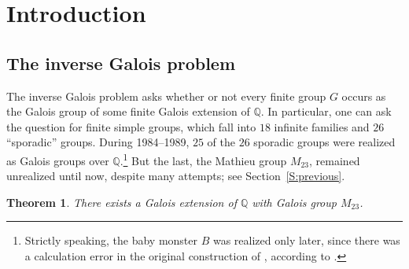\documentclass[12pt,reqno]{amsart}
\newcommand{\Q}{\mathbb{Q}}
\newtheorem{theorem}{Theorem}[section]
\theoremstyle{definition}
\theoremstyle{remark}
\begin{document}
\begin{abstract}
Researchers studying the inverse Galois problem realized 25 of the 26 sporadic finite simple groups 
as Galois groups over $\Q$ during 1984--1989.
We complete this program by proving that the last remaining sporadic group, the Mathieu group $M_{23}$, 
occurs as a Galois group over $\Q$.
In fact, we produce an explicit degree $23$ polynomial with rational 
coefficients whose splitting field has Galois group $M_{23}$ over $\Q$. 
To accomplish this, we use a non-rigid triple of conjugacy classes of $M_{23}$ and compute Belyi maps to construct an explicit regular Galois extension of $\Q(t)$ with Galois group $M_{23}$.
Essential for our computation is the numerical Belyi map algorithm developed and implemented by Klug, Musty, Schiavone, Sijsling, and Voight, inspired by ideas of Hejhal and Stark.
\end{abstract}

\maketitle

\section{Introduction}\label{S:introduction}

\subsection{The inverse Galois problem}
\label{S:inverse Galois problem}

The inverse Galois problem asks whether or not every finite group $G$ occurs as the Galois group of 
some finite Galois extension of $\Q$.
In particular, one can ask the question for finite simple groups, which fall into $18$ infinite families and $26$ ``sporadic'' groups.
During 1984--1989, $25$ of the $26$ sporadic groups were realized as Galois groups over $\Q$.\footnote{Strictly speaking, the baby monster $B$ was realized only later, since there was a calculation error in the original construction of \cite{Hunt1986}, according to \cite[p.~161]{Malle-Matzat2018}.}
But the last, the Mathieu group $M_{23}$, remained unrealized until now, despite many attempts; see Section~\ref{S:previous}.

\begin{theorem}
\label{T:over Q}
There exists a Galois extension of $\Q$ with Galois group $M_{23}$.
\end{theorem}
\end{document}
